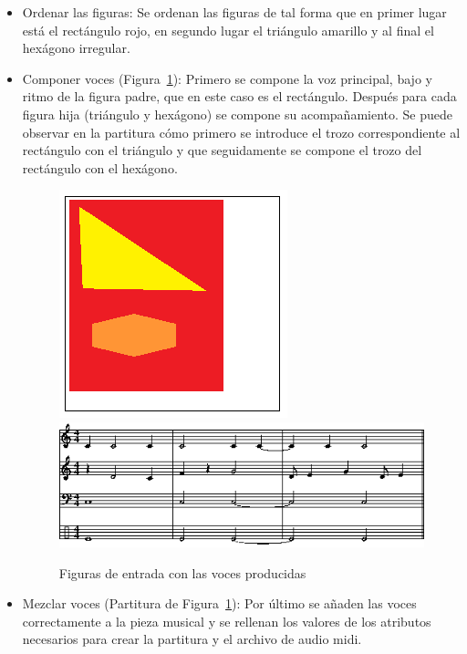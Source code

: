 \begin{itemize}
	\item Ordenar las figuras: Se ordenan las figuras de tal forma que en primer lugar está el rectángulo rojo, en segundo lugar el triángulo amarillo y al final el hexágono irregular.

	\item Componer voces (Figura~\ref{fig:Figura1Mixer}): Primero se compone la voz principal, bajo y ritmo de la figura padre, que en este caso es el rectángulo. Después para cada figura hija (triángulo y hexágono) se compone su acompañamiento. Se puede observar en la partitura cómo primero se introduce el trozo correspondiente al rectángulo con el triángulo y que seguidamente se compone el trozo del rectángulo con el hexágono.

		\begin{figure}[!htbp]
		\centering
		\hspace*{0.0in}
		\includegraphics[scale=1]{graphics/simpletest5.png}
		\includegraphics[scale=0.8]{graphics/simpletest5-partitura.png}
		\caption{Figuras de entrada con las voces producidas}
		\label{fig:Figura1Mixer}
		\end{figure}

	\item Mezclar voces (Partitura de Figura~\ref{fig:Figura1Mixer}): Por último se añaden las voces correctamente a la pieza musical y se rellenan los valores de los atributos necesarios para crear la partitura y el archivo de audio midi.

\end{itemize}

